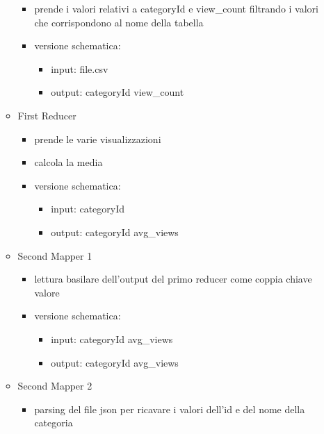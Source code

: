 \documentclass[10pt]{article}
\begin{document}
\begin{itemize}
\begin{itemize}
\begin{itemize}
                    \item prende i valori relativi a categoryId e view\_count filtrando i valori che corrispondono al nome della tabella
                    \item versione schematica:
                    \begin{itemize}
                        \item input: file.csv
                        \item output: categoryId \textrightarrow view\_count
                    \end{itemize}
                \end{itemize}
            \item First Reducer
                \begin{itemize}
                    \item prende le varie visualizzazioni
                    \item calcola la media
                    \item versione schematica:
                    \begin{itemize}
                        \item input: categoryId 
                        \item output: categoryId \textrightarrow avg\_views
                    \end{itemize}
                \end{itemize}
            \item Second Mapper 1
                \begin{itemize}
                    \item lettura basilare dell'output del primo reducer come coppia chiave valore
                    \item versione schematica:
                    \begin{itemize}
                        \item input: categoryId \textrightarrow avg\_views
                        \item output: categoryId \textrightarrow avg\_views
                    \end{itemize}
                \end{itemize}
            \item Second Mapper 2
                \begin{itemize}
                    \item parsing del file json per ricavare i valori dell'id e del nome della categoria

\end{itemize}
\end{itemize}
\end{itemize}
\end{document}
